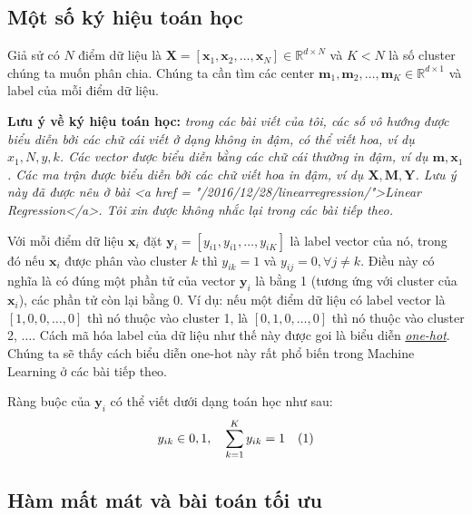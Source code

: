  
\subsection{Một số ký hiệu toán học}
Giả sử có $N$ điểm dữ liệu là $ \mathbf{X} = [\mathbf{x}_1, \mathbf{x}_2, \dots, \mathbf{x}_N] \in \mathbb{R}^{d \times N}$ và $K < N$ là số cluster chúng ta muốn phân chia. Chúng ta cần tìm các center $ \mathbf{m}_1, \mathbf{m}_2, \dots, \mathbf{m}_K \in \mathbb{R}^{d \times 1} $ và label của mỗi điểm dữ liệu. 
 
\textbf{Lưu ý về ký hiệu toán học:} \textit{trong các bài viết của tôi, các số vô hướng được biểu diễn bởi các chữ cái viết ở dạng không in đậm, có thể viết hoa, ví dụ $x_1, N, y, k$. Các vector được biểu diễn bằng các chữ cái thường in đậm, ví dụ $\mathbf{m}, \mathbf{x}_1 $. Các ma trận được biểu diễn bởi các chữ viết hoa in đậm, ví dụ $\mathbf{X, M, Y} $. Lưu ý này đã được nêu ở bài <a href = "/2016/12/28/linearregression/">Linear Regression</a>. Tôi xin được không nhắc lại trong các bài tiếp theo.} 
 
Với mỗi điểm dữ liệu $ \mathbf{x}_i $ đặt $\mathbf{y}_i = [y_{i1}, y_{i1}, \dots, y_{iK}]$ là label vector của nó, trong đó nếu $ \mathbf{x}_i $ được phân vào cluster $k$ thì  $y_{ik} = 1$ và $y_{ij} = 0, \forall j \neq k $. Điều này có nghĩa là có đúng một phần tử của vector $\mathbf{y}_i$ là bằng 1 (tương ứng với cluster của $\mathbf{x}_i $), các phần tử còn lại bằng 0. Ví dụ: nếu một điểm dữ liệu có label vector là $[1,0,0,\dots,0]$ thì nó thuộc vào cluster 1, là $[0,1,0,\dots,0]$ thì nó thuộc vào cluster 2, $\dots$. Cách mã hóa label của dữ liệu như thế này được goi là biểu diễn \href{https://en.wikipedia.org/wiki/One-hot}{\textit{one-hot}}. Chúng ta sẽ thấy cách biểu diễn one-hot này rất phổ biến trong Machine Learning ở các bài tiếp theo.  
 
Ràng buộc của $\mathbf{y}_i $ có thể viết dưới dạng toán học như sau: 
\begin{equation}
 y_{ik} \in \\{0, 1\\},~~~ \sum_{k = 1}^K y_{ik} = 1 ~~~ (1) 
\end{equation}
 
 
\subsection{Hàm mất mát và bài toán tối ưu}
 
